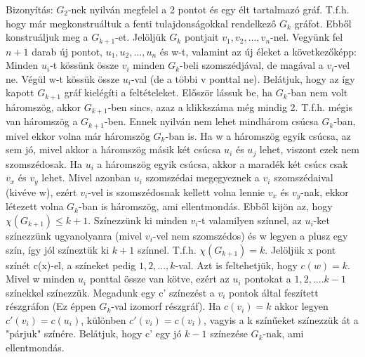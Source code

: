 \documentclass[]{article}
\begin{document}
\begin{leftbar}
Bizonyítás: $G_2$-nek nyilván megfelel a 2 pontot és egy élt tartalmazó gráf. T.f.h. hogy már megkonstruáltuk a fenti tulajdonságokkal rendelkező $G_k$ gráfot. Ebből konstruáljuk meg a $G_{k+1}$-et. Jelöljük $G_k$ pontjait $v_1, v_2,..., v_n$-nel. Vegyünk fel $n + 1$ darab új pontot, $u_1, u_2,..., u_n$ és w-t, valamint az új éleket a következőképp: Minden $u_i$-t kössünk össze $v_i$ minden $G_k$-beli szomszédjával, de magával a $v_i$-vel ne. Végül w-t kössük össze $u_i$-val (de a többi v ponttal ne). Belátjuk, hogy az így kapott $G_{k+1}$ gráf kielégíti a feltételeket. Először lássuk be, ha $G_k$-ban nem volt háromszög, akkor $G_{k+1}$-ben sincs, azaz a klikkszáma még mindig 2. T.f.h. mégis van háromszög a $G_{k+1}$-ben. Ennek nyilván nem lehet mindhárom csúcsa $G_k$-ban, mivel ekkor volna már háromszög $G_k$-ban is. Ha w a háromszög egyik csúcsa, az sem jó, mivel akkor a háromszög másik két csúcsa $u_i$ és $u_j$ lehet, viszont ezek nem szomszédosak. Ha $u_i$ a háromszög egyik csúcsa, akkor a maradék két csúcs csak $v_x$ és $v_y$ lehet. Mivel azonban $u_i$ szomszédai megegyeznek a $v_i$ szomszédaival (kivéve w), ezért $v_i$-vel is szomszédosnak kellett volna lennie $v_x$ és $v_y$-nak, ekkor létezett volna $G_k$-ban is háromszög, ami ellentmondás. Ebből kijön az, hogy $\chi(G_{k+1}) \leq k + 1$. Színezzünk ki minden $v_i$-t valamilyen színnel, az $u_i$-ket színezzünk ugyanolyanra (mivel $v_i$-vel nem szomszédos) és w legyen a plusz egy szín, így jól színeztük ki $k+1$ színnel. T.f.h. $\chi(G_{k+1}) = k$. Jelöljük x pont színét c(x)-el, a színeket pedig $1, 2,..., k$-val. Azt is feltehetjük, hogy $c(w) = k$. Mivel w minden $u_i$ ponttal össze van kötve, ezért az $u_i$ pontokat a $1, 2,....k - 1$ színekkel színezzük. Megadunk egy c' színezést a $v_i$ pontok által feszített részgráfon (Ez éppen $G_k$-val izomorf részgráf). Ha $c(v_i) = k$ akkor legyen $c'(v_i) = c(u_i)$, különben $c'(v_i) = c(v_i)$, vagyis a k színűeket színezzük át a "párjuk" színére. Belátjuk, hogy c' egy jó $k-1$ színezése $G_k$-nak, ami ellentmondás.
\end{leftbar}
\end{document}
